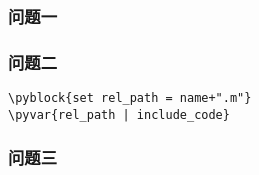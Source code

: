 \subsubsection{问题一}
\subsubsection{问题二}
\noindent
\textit{}
\begin{lstlisting}[frame=single]
\pyblock{set rel_path = name+".m"}
\pyvar{rel_path | include_code}
\end{lstlisting}
\subsubsection{问题三}